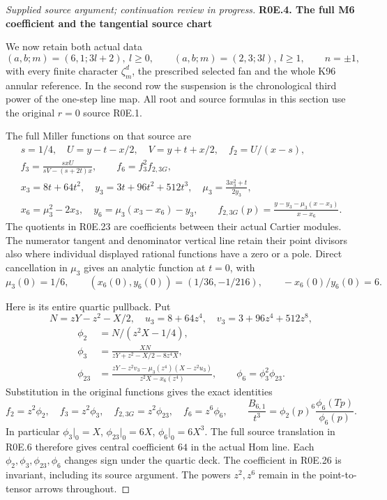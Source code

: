 \begin{proof}[Supplied source argument; continuation review in progress]
\par

\medskip\noindent\textbf{R0E.4. The full M6 coefficient and the tangential source chart}

\par\nobreak

We now retain both actual data
\[
 (a,b;m)=(6,1;3l+2),\ l\geq0,
 \qquad (a,b;m)=(2,3;3l),\ l\geq1,
 \qquad n=\pm1,
 \tag{R0E.22}
\]
with every finite character \(\zeta_m^d\), the prescribed selected
fan and the whole K96 annular reference. In the second row the
suspension is the chronological third power of the one-step line
map. All root and source formulas in this section use the original
\(r=0\) source R0E.1.

The full Miller functions on that source are
\[
 \begin{gathered}
 s=1/4,\quad U=y-t-x/2,\quad V=y+t+x/2,\quad
 f_2=U/(x-s),\\
 f_3=\frac{s xU}{sV-(s+2t)x},\qquad
 f_6=f_3^2 f_{2,3G},\\
 x_3=8t+64t^2,\quad y_3=3t+96t^2+512t^3,\quad
 \mu_3=\frac{3x_3^2+t}{2y_3},\\
 x_6=\mu_3^2-2x_3,\quad
 y_6=\mu_3(x_3-x_6)-y_3,\qquad
 f_{2,3G}(p)=\frac{y-y_3-\mu_3(x-x_3)}{x-x_6}.
 \end{gathered}                                                   \tag{R0E.23}
\]
The quotients in R0E.23 are coefficients between their actual
Cartier modules. The numerator tangent and denominator vertical
line retain their point divisors also where individual displayed
rational functions have a zero or a pole. Direct cancellation in
\(\mu_3\) gives an analytic function at \(t=0\), with
\[
 \mu_3(0)=1/6,\qquad (x_6(0),y_6(0))=(1/36,-1/216),
 \qquad -x_6(0)/y_6(0)=6.
 \tag{R0E.24}
\]

Here is its entire quartic pullback. Put
\[
 N=zY-z^2-X/2,\quad u_3=8+64z^4,\quad
 v_3=3+96z^4+512z^8,
\]
\[
 \begin{split}
 \phi_2&=N/(z^2X-1/4),\\
 \phi_3&=\frac{XN}{zY+z^2-X/2-8z^4X},\\
 \phi_{23}&=
 \frac{zY-z^2v_3-\mu_3(z^4)(X-z^2u_3)}{z^2X-x_6(z^4)},
 \qquad \phi_6=\phi_3^2\phi_{23}.
 \end{split}                                                     \tag{R0E.25}
\]
Substitution in the original functions gives the exact identities
\[
 f_2=z^2\phi_2,\quad f_3=z^2\phi_3,\quad
 f_{2,3G}=z^2\phi_{23},\quad f_6=z^6\phi_6,
 \qquad
 \frac{B_{6,1}}{t^3}=\phi_2(p)^6\frac{\phi_6(Tp)}{\phi_6(p)}.
 \tag{R0E.26}
\]
In particular \(\phi_3|_0=X\), \(\phi_{23}|_0=6X\),
\(\phi_6|_0=6X^3\). The full source translation in R0E.6 therefore
gives central coefficient \(64\) in the actual Hom line. Each
\(\phi_2,\phi_3,\phi_{23},\phi_6\) changes sign under the quartic
deck. The coefficient in R0E.26 is invariant, including its source
argument. The powers \(z^2,z^6\) remain in the point-to-tensor
arrows throughout.


\end{proof}
